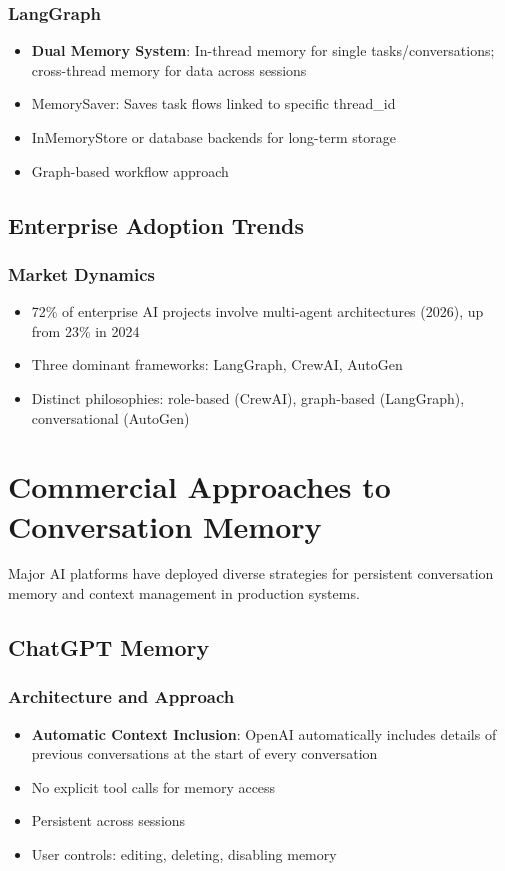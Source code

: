 \documentclass[11pt,letterpaper]{article}
\begin{document}
\subsubsection{LangGraph}
\begin{itemize}[leftmargin=*]
    \item \textbf{Dual Memory System}: In-thread memory for single tasks/conversations; cross-thread memory for data across sessions
    \item MemorySaver: Saves task flows linked to specific thread\_id
    \item InMemoryStore or database backends for long-term storage
    \item Graph-based workflow approach
\end{itemize}

\subsection{Enterprise Adoption Trends}

\subsubsection{Market Dynamics}
\begin{itemize}[leftmargin=*]
    \item 72\% of enterprise AI projects involve multi-agent architectures (2026), up from 23\% in 2024
    \item Three dominant frameworks: LangGraph, CrewAI, AutoGen
    \item Distinct philosophies: role-based (CrewAI), graph-based (LangGraph), conversational (AutoGen)
\end{itemize}

\section{Commercial Approaches to Conversation Memory}

Major AI platforms have deployed diverse strategies for persistent conversation memory and context management in production systems.

\subsection{ChatGPT Memory}

\subsubsection{Architecture and Approach}
\begin{itemize}[leftmargin=*]
    \item \textbf{Automatic Context Inclusion}: OpenAI automatically includes details of previous conversations at the start of every conversation
    \item No explicit tool calls for memory access
    \item Persistent across sessions
    \item User controls: editing, deleting, disabling memory
\end{itemize}
\end{document}
